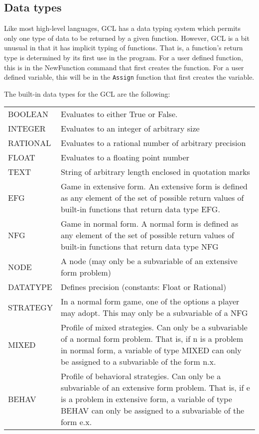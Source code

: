 \subsection{Data types}

Like most high-level languages, GCL has a data typing system which
permits only one type of data to be returned by a given function.
However, GCL is a bit unusual in that it has implicit typing of
functions.  That is, a function's return type is determined by its
first use in the program.  For a user defined function, this is in the
NewFunction command that first creates the function.  For a user
defined variable, this will be in the \verb+Assign+ function that
first creates the variable.

The built-in data types for the GCL are the following:  

\medskip

\begin{tabular}{lp{4in}}
BOOLEAN & Evaluates to either True or False. \\ 

INTEGER & Evaluates to an integer of arbitrary size \\ 

RATIONAL & Evaluates to a rational number of arbitrary precision\\ 

FLOAT 	& Evaluates to a floating point number \\

TEXT	& String of arbitrary length enclosed in quotation marks\\ 

EFG	& Game in extensive form.  An extensive form is defined as any
element of the set of possible return values of built-in functions
that return data type EFG.\\

NFG	& Game in normal form.  A normal form is defined as any
element of the set of possible return values of built-in functions
that return data type NFG\\

NODE	& A node (may only be a subvariable of an extensive
form problem) \\ 

DATATYPE & Defines precision (constants: Float or
Rational) \\ 

STRATEGY & In a normal form game, one of the options a player may adopt.
This may only be a subvariable of a NFG \\

MIXED	& {Profile of mixed strategies.  Can only be a
subvariable of a normal form problem.  That is, if n is a problem in
normal form, a variable of type MIXED can only be assigned to a
subvariable of the form n.x.}\\ 

BEHAV	& Profile of behavioral
strategies.  Can only be a subvariable of an extensive form problem.
That is, if e is a problem in extensive form, a variable of type BEHAV
can only be assigned to a subvariable of the form e.x. \\
\end{tabular}



